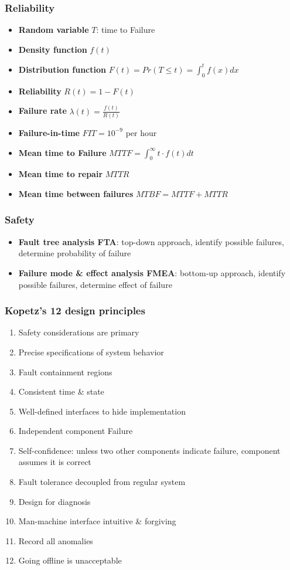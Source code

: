 \documentclass{article}
\begin{document}
\subsubsection{Reliability}
\begin{itemize}
  \item \textbf{Random variable} $T$: time to Failure
  \item \textbf{Density function} $f(t)$
  \item \textbf{Distribution function} $F(t)=Pr(T\leq t)=\int_{0}^{t}{f(x)dx}$
  \item \textbf{Reliability} $R(t)=1-F(t)$
  \item \textbf{Failure rate} $\lambda(t)=\frac{f(t)}{R(t)}$
  \item \textbf{Failure-in-time} $FIT=10^{-9}$ per hour
  \item \textbf{Mean time to Failure} $MTTF=\int_{0}^{\infty}{t \cdot f(t)dt}$
  \item \textbf{Mean time to repair} $MTTR$
  \item \textbf{Mean time between failures} $MTBF=MTTF+MTTR$
\end{itemize}

\subsubsection{Safety}
\begin{itemize}
  \item \textbf{Fault tree analysis FTA}: top-down approach, identify possible failures, determine probability of failure
  \item \textbf{Failure mode \& effect analysis FMEA}: bottom-up approach, identify possible failures, determine effect of failure
\end{itemize}

\subsubsection{Kopetz's 12 design principles}
\begin{enumerate}
  \item Safety considerations are primary
  \item Precise specifications of system behavior
  \item Fault containment regions
  \item Consistent time \& state
  \item Well-defined interfaces to hide implementation
  \item Independent component Failure
  \item Self-confidence: unless two other components indicate failure, component assumes it is correct
  \item Fault tolerance decoupled from regular system
  \item Design for diagnosis
  \item Man-machine interface intuitive \& forgiving
  \item Record all anomalies
  \item Going offline is unacceptable
\end{enumerate}
\end{document}
